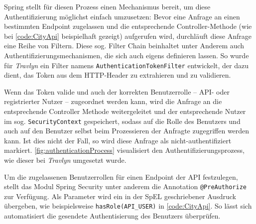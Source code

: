 		Spring stellt für diesen Prozess einen Mechanismus bereit, um diese Authentifizierung möglichst einfach umzusetzen: Bevor eine Anfrage an einen bestimmten Endpoint zugelassen und die entsprechende Controller-Methode (wie bei \autoref{code:CityApi} beispielhaft gezeigt) aufgerufen wird, durchläuft diese Anfrage eine Reihe von Filtern. Diese sog. Filter Chain beinhaltet unter Anderem auch Authentifizierungsmechanismen, die sich auch eigens definieren lassen. So wurde für \textit{Travlyn} ein Filter namens \lstinline|AuthenticationTokenFilter| entwickelt, der dazu dient, das Token aus dem \acs{HTTP}-Header zu extrahieren und zu validieren. 
		
		Wenn das Token valide und auch der korrekten Benutzerrolle -- \acs{API}- oder registrierter Nutzer -- zugeordnet werden kann, wird die Anfrage an die entsprechende Controller Methode weitergeleitet und der entsprechende Nutzer im sog. \lstinline|SecurityContext| gespeichert, sodass auf die Rolle des Benutzers und auch auf den Benutzer selbst beim Prozessieren der Anfragte zugegriffen werden kann. Ist dies nicht der Fall, so wird diese Anfrage als nicht-authentifiziert markiert. \autoref{fig:authenticationProcess} visualisiert den Authentifizierungsprozess, wie dieser bei \textit{Travlyn} umgesetzt wurde.
		
		
		
		Um die zugelassenen Benutzerrollen für einen Endpoint der \acs{API} festzulegen, stellt das Modul Spring Security unter anderem die Annotation \lstinline|@PreAuthorize| zur Verfügung. Als Parameter wird ein in der \ac{SpEL} geschriebener Ausdruck übergeben, wie beispielsweise \lstinline|hasRole(API_USER)| in \autoref{code:CityApi}. So lässt sich automatisiert die gesendete Authentisierung des Benutzers überprüfen. 
		

